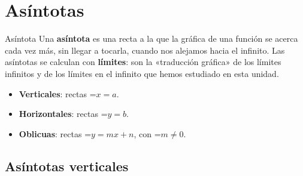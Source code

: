 \documentclass[11pt,a4paper]{article}
\newcommand{\fmm}[1]{\setbox0=\hbox{$#1$}\ifdim\wd0>\linewidth\[#1\]\else\mbox{\box0}\fi}
\begin{document}
  
\section{Asíntotas}\hypertarget{sec10}{}

  

  
\begin{fmdef}{Asíntota}
Una \textbf{asíntota} es una recta a la que la gráfica de una función se acerca cada vez más, sin llegar a tocarla, cuando nos alejamos hacia el infinito. Las asíntotas se calculan con \textbf{límites}: son la «traducción gráfica» de los límites infinitos y de los límites en el infinito que hemos estudiado en esta unidad.

      
\begin{itemize}
\item \textbf{Verticales}: rectas \fmm{x=a}.
\item \textbf{Horizontales}: rectas \fmm{y=b}.
\item \textbf{Oblicuas}: rectas \fmm{y=mx+n}, con \fmm{m\neq0}.
\end{itemize}
\end{fmdef}

  
\subsection*{Asíntotas verticales}
\end{document}
